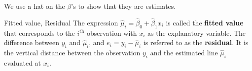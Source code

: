 \begin{Remark}{}{}
    We use a hat on the $ \beta $'s to show that they are estimates.
\end{Remark}
\begin{Definition}{Fitted value, Residual}{}
    The expression
    $ \hat{\mu}_i=\hat{\beta}_0+\hat{\beta}_1x_i $
    is called the \textbf{fitted value}
    that corresponds to the $ i^{\text{th}} $ observation
    with $ x_i $ as the explanatory variable.
    The difference between $ y_i $ and $ \hat{\mu}_i $,
    and $ e_i=y_i-\hat{\mu}_i $ is referred
    to as the \textbf{residual}. It is
    the vertical distance between the observation $ y_i $
    and the estimated line $ \hat{\mu}_i $
    evaluated at $ x_i $.
\end{Definition}
